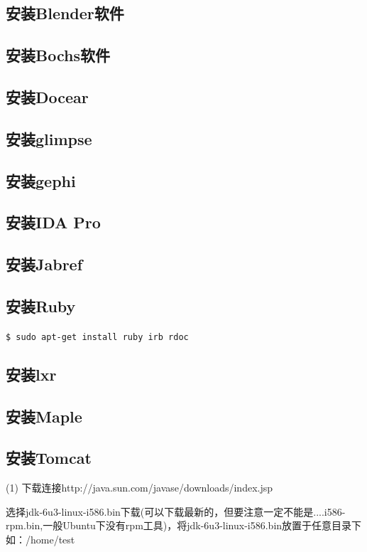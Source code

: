 \subsection{安装Blender软件}

\subsection{安装Bochs软件}

\subsection{安装Docear}

\subsection{安装glimpse}

\subsection{安装gephi}

\subsection{安装IDA Pro}

\subsection{安装Jabref}

\subsection{安装Ruby}
\verb"$ sudo apt-get install ruby irb rdoc"

\subsection{安装lxr}

\subsection{安装Maple}

\subsection{安装Tomcat}
(1)	下载连接http://java.sun.com/javase/downloads/index.jsp

选择jdk-6u3-linux-i586.bin下载(可以下载最新的，但要注意一定不能是....i586-rpm.bin,一般Ubuntu下没有rpm工具)，将jdk-6u3-linux-i586.bin放置于任意目录下如：/home/test

